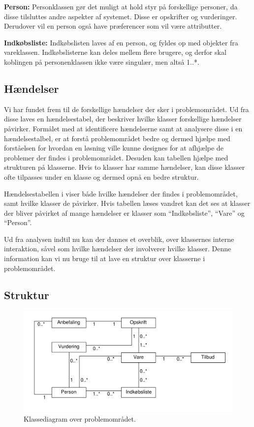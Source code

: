 \textbf{Person:}
Personklassen gør det muligt at hold styr på forskellige personer, da disse tilsluttes andre aspekter af systemet.
Disse er opskrifter og vurderinger.
Derudover vil en person også have præferencer som vil være attributter.

\textbf{Indkøbsliste:}
Indkøbslisten laves af en person, og fyldes op med objekter fra vareklassen.
Indkøbslisterne kan deles mellem flere brugere, og derfor skal koblingen på personenklassen ikke være singulær, men altså 1..*.

\subsection{Hændelser}
Vi har fundet frem til de forskellige hændelser der sker i problemområdet.
Ud fra disse laves en hændelsestabel, der beskriver hvilke klasser forskellige hændelser påvirker.
Formålet med at identificere hændelserne samt at analysere disse i en hændelsestalbel, er at forstå problemområdet bedre og dermed hjælpe med forståelsen for hvordan en løsning ville kunne designes for at afhjælpe de problemer der findes i problemområdet. Desuden kan tabellen hjælpe med strukturen på klasserne.
Hvis to klasser har samme hændelser, kan disse klasser ofte tilpasses under en klasse og dermed opnå en bedre struktur.



Hændelsestabellen i  viser både hvilke hændelser der findes i problemområdet, samt hvilke klasser de påvirker.
Hvis tabellen læses vandret kan det ses at klasser der bliver påvirket af mange hændelser er klasser som ``Indkøbsliste'', ``Vare'' og ``Person''.

Ud fra analysen indtil nu kan der dannes et overblik, over klassernes interne interaktion, såvel som hvilke hændelser der involverer hvilke klasser.
Denne information kan vi nu bruge til at lave en struktur over klasserne i problemområdet.

\subsection{Struktur}\label{sec:struktur}
\begin{figure}
	\centering
		\includegraphics[scale=0.6]{images/Diagrams/klassediagram_model_simple.pdf}
	\caption{Klassediagram over problemområdet.}
	\label{figur:PDklasse}
\end{figure}

